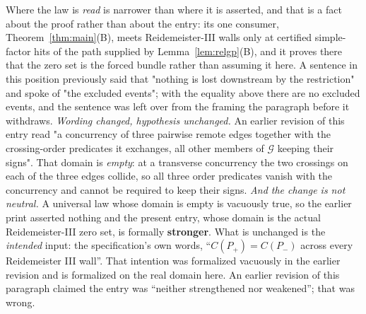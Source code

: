 \begin{remark}
Where the law is \emph{read} is narrower than where it is asserted, and that is
a fact about the proof rather than about the entry: its one consumer,
Theorem~\ref{thm:main}(B), meets Reidemeister-III walls only at certified simple-factor hits of the
path supplied by Lemma~\ref{lem:relgp}(B), and it proves there that the zero set is
the forced bundle rather than assuming it here. A sentence in this position previously said that "nothing is lost
downstream by the restriction" and spoke of "the excluded events"; with the
equality above there are no excluded events, and the sentence was left over from
the framing the paragraph before it withdraws.
\emph{Wording changed, hypothesis unchanged.} An earlier revision of this entry
read "a concurrency of three pairwise remote edges together with the
crossing-order predicates it exchanges, all other members of $\mathcal G$
keeping their signs". That domain is \emph{empty}: at a transverse concurrency
the two crossings on each of the three edges collide, so all three order
predicates vanish with the concurrency and cannot be required to keep their
signs. \emph{And the change is not neutral.} A universal law whose domain is empty is
vacuously true, so the earlier print asserted nothing and the present entry,
whose domain is the actual Reidemeister-III zero set, is formally
\textbf{stronger}. What is unchanged is the \emph{intended} input: the
specification's own words, ``$C(P_+)=C(P_-)$ across every Reidemeister III
wall''. That intention was formalized vacuously in the earlier revision and is
formalized on the real domain here. An earlier revision of this paragraph
claimed the entry was ``neither strengthened nor weakened''; that was wrong.
\end{remark}




